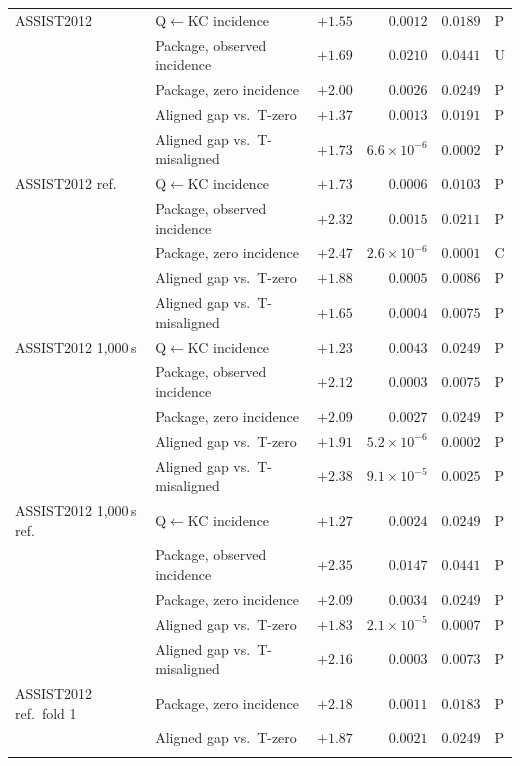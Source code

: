 \begin{table}[H]
\begin{tabular}{@{}llrrrl@{}}
\addlinespace
ASSIST2012 & Q$\leftarrow$KC incidence & $+1.55$ & $0.0012$ & $0.0189$ & P \\
 & Package, observed incidence & $+1.69$ & $0.0210$ & $0.0441$ & U \\
 & Package, zero incidence & $+2.00$ & $0.0026$ & $0.0249$ & P \\
 & Aligned gap vs.\ T-zero & $+1.37$ & $0.0013$ & $0.0191$ & P \\
 & Aligned gap vs.\ T-misaligned & $+1.73$ & $6.6\times10^{-6}$ & $0.0002$ & P \\
\addlinespace
ASSIST2012 ref. & Q$\leftarrow$KC incidence & $+1.73$ & $0.0006$ & $0.0103$ & P \\
 & Package, observed incidence & $+2.32$ & $0.0015$ & $0.0211$ & P \\
 & Package, zero incidence & $+2.47$ & $2.6\times10^{-6}$ & $0.0001$ & C \\
 & Aligned gap vs.\ T-zero & $+1.88$ & $0.0005$ & $0.0086$ & P \\
 & Aligned gap vs.\ T-misaligned & $+1.65$ & $0.0004$ & $0.0075$ & P \\
\addlinespace
ASSIST2012 1{,}000\,s & Q$\leftarrow$KC incidence & $+1.23$ & $0.0043$ & $0.0249$ & P \\
 & Package, observed incidence & $+2.12$ & $0.0003$ & $0.0075$ & P \\
 & Package, zero incidence & $+2.09$ & $0.0027$ & $0.0249$ & P \\
 & Aligned gap vs.\ T-zero & $+1.91$ & $5.2\times10^{-6}$ & $0.0002$ & P \\
 & Aligned gap vs.\ T-misaligned & $+2.38$ & $9.1\times10^{-5}$ & $0.0025$ & P \\
\addlinespace
ASSIST2012 1{,}000\,s ref. & Q$\leftarrow$KC incidence & $+1.27$ & $0.0024$ & $0.0249$ & P \\
 & Package, observed incidence & $+2.35$ & $0.0147$ & $0.0441$ & P \\
 & Package, zero incidence & $+2.09$ & $0.0034$ & $0.0249$ & P \\
 & Aligned gap vs.\ T-zero & $+1.83$ & $2.1\times10^{-5}$ & $0.0007$ & P \\
 & Aligned gap vs.\ T-misaligned & $+2.16$ & $0.0003$ & $0.0073$ & P \\
\addlinespace
ASSIST2012 ref.\ fold 1 & Package, zero incidence & $+2.18$ & $0.0011$ & $0.0183$ & P \\
 & Aligned gap vs.\ T-zero & $+1.87$ & $0.0021$ & $0.0249$ & P \\
\addlinespace

\end{tabular}
\end{table}
